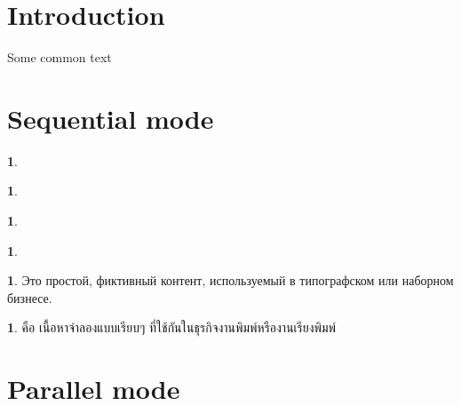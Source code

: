 \documentclass{article}
\theoremstyle{definition}
\newtheorem{definition}[theorem]{\GetTranslation{Definition}}
\begin{document}
\section{Introduction}
Some common text
\cym{\lipsum[1]}
\eng{\lipsum[2]}
\bre{\lipsum[3]}
\fra{\lipsum[4]}
\rus{\lipsum[5]}
\tha{\lipsum[6]}

\section{Sequential mode}

\begin{cymraeg}
\begin{definition}
\lipsum[1]
\end{definition}
\end{cymraeg}

\begin{english}
\begin{definition}
\lipsum[2]
\end{definition}
\end{english}

\begin{brezhoneg}
\begin{definition}
\lipsum[3]
\end{definition}
\end{brezhoneg}

\begin{francais}
\begin{definition}
\lipsum[4]
\end{definition}
\end{francais}

\begin{russkiy}
\begin{definition}
Это простой, фиктивный контент, используемый в типографском или наборном бизнесе.
\end{definition}
\end{russkiy}

\begin{thai}
\begin{definition}
คือ เนื้อหาจำลองแบบเรียบๆ ที่ใช้กันในธุรกิจงานพิมพ์หรืองานเรียงพิมพ์
\end{definition}
\end{thai}

\section{Parallel mode}
\end{document}
